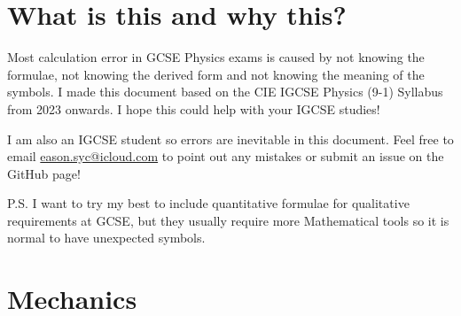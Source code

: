 \documentclass[8pt]{article}
\author{\Author}
\title{\Title}
\date{Version 1.0.1. \Date}
\begin{document}
	\maketitle

	\tableofcontents

    \section*{What is this and why this?}
        Most calculation error in GCSE Physics exams is caused by not knowing the formulae, not knowing the derived form and not knowing the meaning of the symbols. I made this document based on the CIE IGCSE Physics (9-1) Syllabus from 2023 onwards. I hope this could help with your IGCSE studies!

        I am also an IGCSE student so errors are inevitable in this document. Feel free to email \href{eason.syc@icloud.com}{eason.syc@icloud.com} to point out any mistakes or submit an issue on the GitHub page!

        P.S. I want to try my best to include quantitative formulae for qualitative requirements at GCSE, but they usually require more Mathematical tools so it is normal to have unexpected symbols.

    \section{Mechanics}
\end{document}
